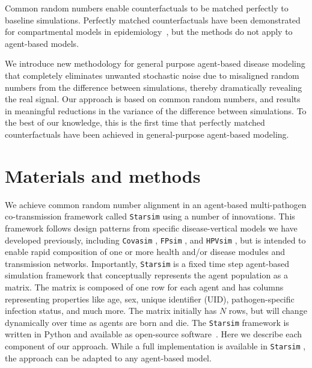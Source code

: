 \documentclass[10pt,letterpaper]{article}
\newcommand{\starsim}{\texttt{Starsim} }
\newcommand{\covasim}{\texttt{Covasim} }
\newcommand{\fpsim}{\texttt{FPsim} }
\newcommand{\hpvsim}{\texttt{HPVsim} }
\begin{document}
Common random numbers enable counterfactuals to be matched perfectly to baseline simulations. Perfectly matched counterfactuals have been demonstrated for compartmental models in epidemiology~\cite{kaminsky_perfect_2019}, but the methods do not apply to agent-based models.

We introduce new methodology for general purpose agent-based disease modeling that completely eliminates unwanted stochastic noise due to misaligned random numbers from the difference between simulations, thereby dramatically revealing the real signal. Our approach is based on common random numbers, and results in meaningful reductions in the variance of the difference between simulations. To the best of our knowledge, this is the first time that perfectly matched counterfactuals have been achieved in general-purpose agent-based modeling.


\section*{Materials and methods}\label{s:methods}



We achieve common random number alignment in an agent-based multi-pathogen co-transmission framework called \starsim using a number of innovations. This framework follows design patterns from specific disease-vertical models we have developed previously, including \covasim \cite{kerr2021covasim}, \fpsim \cite{fpsim}, and \hpvsim \cite{hpvsim}, but is intended to enable rapid composition of one or more health and/or disease modules and transmission networks. Importantly, \starsim is a fixed time step agent-based simulation framework that conceptually represents the agent population as a matrix. The matrix is composed of one row for each agent and has columns representing properties like age, sex, unique identifier (UID), pathogen-specific infection status, and much more. The matrix initially has $N$ rows, but will change dynamically over time as agents are born and die. The \starsim framework is written in Python and available as open-source software~\cite{starsim}. Here we describe each component of our approach. While a full implementation is available in \starsim, the approach can be adapted to any agent-based model.
\end{document}

